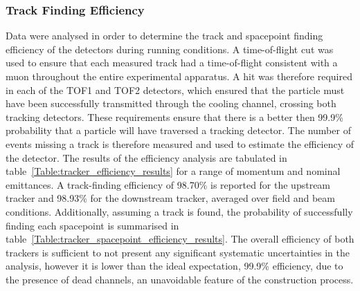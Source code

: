 \subsubsection{Track Finding Efficiency}
\label{trackers:performance:efficiency}
Data were analysed in order to determine the track and spacepoint finding efficiency of the detectors during running conditions. A time-of-flight cut was used to ensure that each measured track had a time-of-flight consistent with a muon throughout the entire experimental apparatus. A hit was therefore required in each of the TOF1 and TOF2 detectors, which ensured that the particle must have been successfully transmitted through the cooling channel, crossing both tracking detectors. These requirements ensure that there is a better then 99.9\% probability that a particle will have traversed a tracking detector.
The number of events missing a track is therefore measured and used to estimate the efficiency of the detector.
The results of the efficiency analysis are tabulated in table~\ref{Table:tracker_efficiency_results} for a range of momentum and nominal emittances. A track-finding efficiency of 98.70\% is reported for the upstream tracker and 98.93\% for the downstream tracker, averaged over field and beam conditions. Additionally, assuming a track is found, the probability of successfully finding each spacepoint is summarised in table~\ref{Table:tracker_spacepoint_efficiency_results}. The overall efficiency of both trackers is sufficient to not present any significant systematic uncertainties in the analysis, however it is lower than the ideal expectation, 99.9\% efficiency, due to the presence of dead channels, an unavoidable feature of the construction process.

